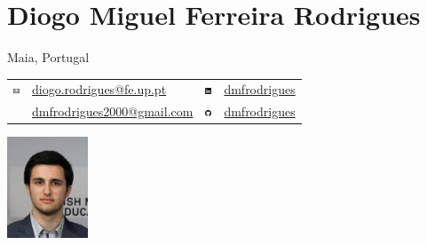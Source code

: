 \documentclass{cv}
\begin{document}
\thispagestyle{empty}
\noindent
\begin{minipage}[l]{0.75\textwidth}
	\section*{Diogo Miguel Ferreira Rodrigues}
    Maia, Portugal\\
    \begin{tabular}{@{}c @{\hskip 0.5em} l @{\hskip 5em} c @{\hskip 0.5em} l @{}}
        \includegraphics[height=7px]{img/email.png}    & \href{mailto:diogo.rodrigues@fe.up.pt}{diogo.rodrigues@fe.up.pt}     & \includegraphics[height=7px]{img/linkedin.png} & \href{https://www.linkedin.com/in/dmfrodrigues/}{dmfrodrigues} \\
                                                       & \href{mailto:dmfrodrigues2000@gmail.com}{dmfrodrigues2000@gmail.com} & \includegraphics[height=7px]{img/github.png}   & \href{https://github.com/dmfrodrigues}{dmfrodrigues}\\
    \end{tabular}
\end{minipage}%
\begin{minipage}[l]{0.24\textwidth}
	\begin{center} \includegraphics[height=30mm]{img/cv_photo.jpg} \end{center}
\end{minipage}
\end{document}
